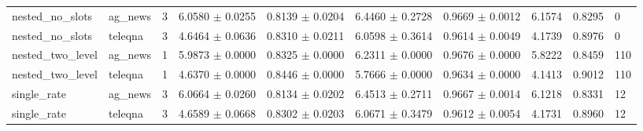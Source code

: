 \begin{tabular}{llllllllll}
nested\_no\_slots & ag\_news & 3 & 6.0580 $\pm$ 0.0255 & 0.8139 $\pm$ 0.0204 & 6.4460 $\pm$ 0.2728 & 0.9669 $\pm$ 0.0012 & 6.1574 & 0.8295 & 0 \\
nested\_no\_slots & teleqna & 3 & 4.6464 $\pm$ 0.0636 & 0.8310 $\pm$ 0.0211 & 6.0598 $\pm$ 0.3614 & 0.9614 $\pm$ 0.0049 & 4.1739 & 0.8976 & 0 \\
nested\_two\_level & ag\_news & 1 & 5.9873 $\pm$ 0.0000 & 0.8325 $\pm$ 0.0000 & 6.2311 $\pm$ 0.0000 & 0.9676 $\pm$ 0.0000 & 5.8222 & 0.8459 & 110 \\
nested\_two\_level & teleqna & 1 & 4.6370 $\pm$ 0.0000 & 0.8446 $\pm$ 0.0000 & 5.7666 $\pm$ 0.0000 & 0.9634 $\pm$ 0.0000 & 4.1413 & 0.9012 & 110 \\
single\_rate & ag\_news & 3 & 6.0664 $\pm$ 0.0260 & 0.8134 $\pm$ 0.0202 & 6.4513 $\pm$ 0.2711 & 0.9667 $\pm$ 0.0014 & 6.1218 & 0.8331 & 12 \\
single\_rate & teleqna & 3 & 4.6589 $\pm$ 0.0668 & 0.8302 $\pm$ 0.0203 & 6.0671 $\pm$ 0.3479 & 0.9612 $\pm$ 0.0054 & 4.1731 & 0.8960 & 12 \\
\hline
\end{tabular}

